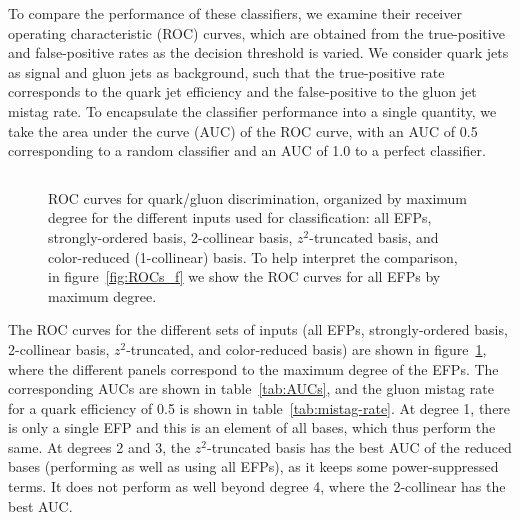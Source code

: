 \documentclass[a4paper,11pt]{article}
\newcommand{\fig}[1]{figure~\ref{fig:#1}}
\newcommand{\tab}[1]{table~\ref{tab:#1}}
\begin{document}
To compare the performance of these classifiers, we examine their receiver operating characteristic (ROC) curves, which are obtained from the true-positive and false-positive rates as the decision threshold is varied.
%
We consider quark jets as signal and gluon jets as background, such that the true-positive rate corresponds to the quark jet efficiency and the false-positive to the gluon jet mistag rate.
%
To encapsulate the classifier performance into a single quantity, we take the area under the curve (AUC) of the ROC curve, with an AUC of 0.5 corresponding to a random classifier and an AUC of 1.0 to a perfect classifier. 

   \begin{figure}[p]
   \centering
     $\qquad$
     \\
      $\qquad$
      \\
     $\qquad$
\caption{ROC curves for quark/gluon discrimination, organized by maximum degree for the different inputs used for classification: all EFPs, strongly-ordered basis, 2-collinear basis, $z^2$-truncated basis, and color-reduced (1-collinear) basis. To help interpret the comparison, in  \fig{ROCs_f} we show the ROC curves for all EFPs by maximum degree. \label{fig:ROCs}}
     \end{figure}

The ROC curves for the different sets of inputs (all EFPs, strongly-ordered basis, 2-collinear basis, $z^2$-truncated, and color-reduced basis) are shown in \fig{ROCs}, where the different panels correspond to the maximum degree of the EFPs.
%
 The corresponding AUCs are shown in \tab{AUCs}, and the gluon mistag rate for a quark efficiency of 0.5 is shown in \tab{mistag-rate}.
%
At degree 1, there is only a single EFP and this is an element of all bases, which thus perform the same.
%
At degrees 2 and 3, the $z^2$-truncated basis has the best AUC of the reduced bases (performing as well as using all EFPs), as it keeps some power-suppressed terms.
%
It does not perform as well beyond degree 4, where the 2-collinear has the best AUC.
\end{document}

